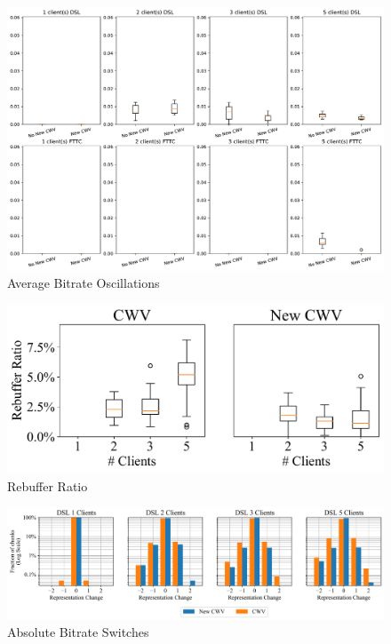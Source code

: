 \documentclass[10pt,sigconf]{acmart}
\begin{document}
  

\begin{figure}
  

      \includegraphics[width=\textwidth]{figures/Average_Oscillations.pdf}

      \caption{Average Bitrate Oscillations}
      \label{fig:avg-oscillations}
\end{figure}
\begin{figure}
      \includegraphics[width=\textwidth, keepaspectratio]{figures/Rebuffer_ratio.pdf}
    \caption{Rebuffer Ratio}
    \label{fig:rebuffer-ratio}
\end{figure}

\begin{figure}
  \centering
  \includegraphics[width=\textwidth, keepaspectratio]{figures/bitrate_derivative_distribution.pdf}
  \caption{Absolute Bitrate Switches}
  \label{fig:bitrate-switches}
\end{figure}
\end{document}

